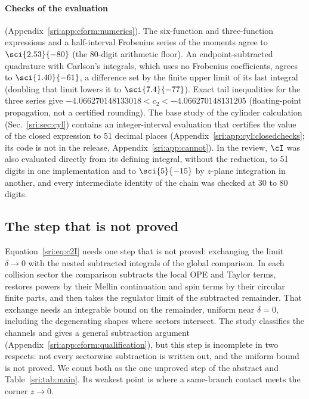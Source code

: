 \paragraph{Checks of the evaluation} (Appendix~\ref{sri:app:cform:numerics}). The six-function and three-function expressions and a half-interval Frobenius
series of the moments agree to $\sci{2.53}{-80}$ (the 80-digit arithmetic floor). An endpoint-subtracted quadrature with
Carlson's integrals, which uses no Frobenius coefficients, agrees to $\sci{1.40}{-61}$, a difference set by the
finite upper limit of its last integral (doubling that limit lowers it to $\sci{7.4}{-77}$). Exact tail inequalities for the three
series give $-4.066270148133018<c_2<-4.066270148131205$ (floating-point propagation, not a certified rounding). The
base study of the cylinder calculation (Sec.~\ref{sri:sec:cyl}) contains an integer-interval evaluation that certifies the
value of the closed expression to 51 decimal places (Appendix~\ref{sri:app:cyl:closedchecks}; its code is not in the
release, Appendix~\ref{sri:app:cannot}). In the review, $\cI$ was also evaluated directly from its defining integral, without
the reduction, to 51 digits in one implementation and to $\sci{5}{-15}$ by $z$-plane integration in another, and every
intermediate identity of the chain was checked at 30 to 80 digits.

\subsection{The step that is not proved}\label{sri:sec:unproved}
Equation~\eqref{sri:eq:c2I} needs one step that is not proved: exchanging the limit $\delta\to0$ with the nested
subtracted integrals of the global comparison. In each collision sector the comparison subtracts the local OPE and
Taylor terms, restores powers by their Mellin continuation and spin terms by their circular finite parts, and then
takes the regulator limit of the subtracted remainder. That exchange needs an integrable bound on the remainder,
uniform near $\delta=0$, including the degenerating shapes where sectors intersect. The study classifies the channels
and gives a general subtraction argument (Appendix~\ref{sri:app:cform:qualification}), but this step is incomplete in two
respects: not every sectorwise
subtraction is written out, and the uniform bound is not proved. We count both as the one unproved step of the
abstract and Table~\ref{sri:tab:main}. Its weakest point is where a same-branch contact meets the corner $z\to0$.

